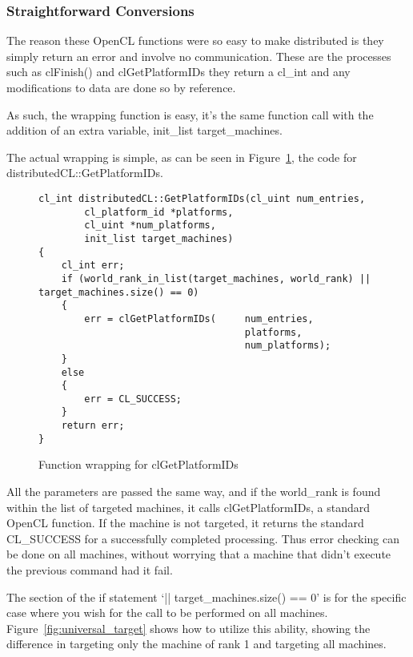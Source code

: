 \documentclass[../thesis.tex]{subfiles}
\begin{document}
    \subsubsection{Straightforward Conversions} %
    \label{ssub:straightforward_conversions}
        The reason these OpenCL functions were so easy to make distributed is they simply return an error and involve no communication. These are the processes such as clFinish() and clGetPlatformIDs they return a cl\_int and any modifications to data are done so by reference.

        As such, the wrapping function is easy, it's the same function call with the addition of an extra variable, init\_list target\_machines.

        The actual wrapping is simple, as can be seen in Figure~\ref{fig:distcl_getplatformids}, the code for distributedCL::GetPlatformIDs.

        \begin{figure}[htbp]
            \centering
            \lstset{language=cpp}
            \begin{lstlisting}[tabsize=2]
cl_int distributedCL::GetPlatformIDs(cl_uint num_entries,
        cl_platform_id *platforms,
        cl_uint *num_platforms,
        init_list target_machines)
{
    cl_int err;
    if (world_rank_in_list(target_machines, world_rank) || target_machines.size() == 0)
    {
        err = clGetPlatformIDs(     num_entries,
                                    platforms,
                                    num_platforms);
    }
    else
    {
        err = CL_SUCCESS;
    }
    return err;
}
            \end{lstlisting}
            \caption{Function wrapping for clGetPlatformIDs}
            \label{fig:distcl_getplatformids}
        \end{figure}

    All the parameters are passed the same way, and if the world\_rank is found within the list of targeted machines, it calls clGetPlatformIDs, a standard OpenCL function. If the machine is not targeted, it returns the standard CL\_SUCCESS for a successfully completed processing. Thus error checking can be done on all machines, without worrying that a machine that didn't execute the previous command had it fail.

    The section of the if statement `|| target\_machines.size() == 0' is for the specific case where you wish for the call to be performed on all machines. Figure~\ref{fig:universal_target} shows how to utilize this ability, showing the difference in targeting only the machine of rank 1 and targeting all machines.
\end{document}
